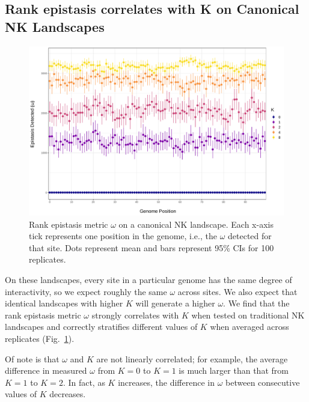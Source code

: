 \subsection{Rank epistasis correlates with K on Canonical NK Landscapes}

\begin{figure}
    \centering
    \includegraphics[width=\textwidth]{chapters/1-rank-epistasis/figs/summary_canon.pdf}
    \caption{Rank epistasis metric $\omega$ on a canonical NK landscape. Each x-axis tick represents one position in the genome, i.e., the $\omega$ detected for that site. Dots represent mean and bars represent 95\% CIs for 100 replicates.}
    \label{fig:res:canon}
\end{figure}

 On these landscapes, every site in a particular genome has the same degree of interactivity, so we expect roughly the same $\omega$ across sites. We also expect that identical landscapes with higher $K$ will generate a higher $\omega$. We find that the rank epistasis metric $\omega$ strongly correlates with $K$ when tested on traditional NK landscapes and correctly stratifies different values of $K$ when averaged across replicates (Fig.~\ref{fig:res:canon}). 

Of note is that $\omega$ and $K$ are not linearly correlated; for example, the average difference in measured $\omega$ from $K=0$ to $K=1$ is much larger than that from $K=1$ to $K=2$. In fact, as $K$ increases, the difference in $\omega$ between consecutive values of $K$ decreases.

